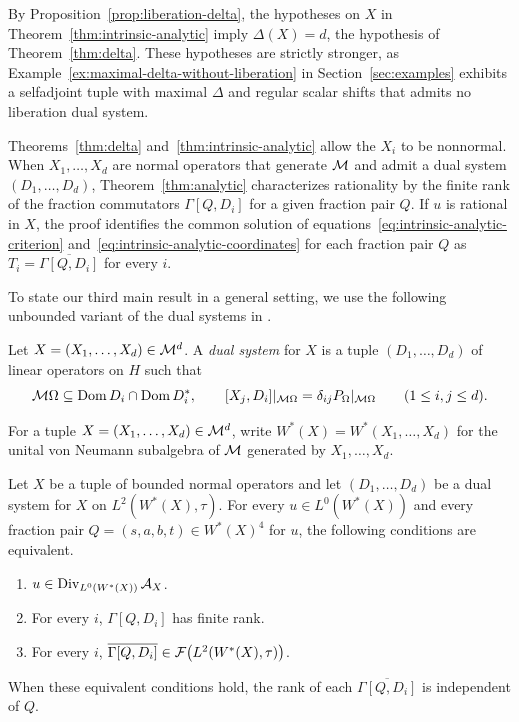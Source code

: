 By Proposition~\ref{prop:liberation-delta}, the hypotheses on $X$ in Theorem~\ref{thm:intrinsic-analytic} imply $\Delta(X)=d$, the hypothesis of Theorem~\ref{thm:delta}.
These hypotheses are strictly stronger, as Example~\ref{ex:maximal-delta-without-liberation} in Section~\ref{sec:examples} exhibits a selfadjoint tuple with maximal $\Delta$ and regular scalar shifts that admits no liberation dual system.

Theorems~\ref{thm:delta} and~\ref{thm:intrinsic-analytic} allow the $X_i$ to be nonnormal.
When $X_1,\ldots,X_d$ are normal operators that generate $\mathcal M$ and admit a dual system $(D_1,\ldots,D_d)$, Theorem~\ref{thm:analytic} characterizes rationality by the finite rank of the fraction commutators $\Gamma[Q,D_i]$ for a given fraction pair $Q$.
If $u$ is rational in $X$, the proof identifies the common solution of equations~\eqref{eq:intrinsic-analytic-criterion} and~\eqref{eq:intrinsic-analytic-coordinates} for each fraction pair $Q$ as $T_i=\overline{\Gamma[Q,D_i]}$ for every $i$.

To state our third main result in a general setting, we use the following unbounded variant of the dual systems in \cite[Definition~5.1]{Voi98}.

\begin{definition}\label{def:dual-system}
Let $X=(X_1,\ldots,X_d)\in\mathcal M^d$.
A \emph{dual system} for $X$ is a tuple $(D_1,\ldots,D_d)$ of linear operators on $H$ such that
\begin{equation}\label{eq:analytic-hyp}
 \mathcal M\Omega\subseteq\operatorname{Dom} D_i\cap\operatorname{Dom} D_i^*,\qquad
 [X_j,D_i]|_{\mathcal M\Omega}=\delta_{ij}P_\Omega|_{\mathcal M\Omega}
 \qquad(1\leq i,j\leq d).
\end{equation}
\end{definition}

For a tuple $X=(X_1,\ldots,X_d)\in\mathcal M^d$, write $W^*(X)=W^*(X_1,\ldots,X_d)$ for the unital von Neumann subalgebra of $\mathcal M$ generated by $X_1,\dots,X_d$.

\begin{theorem}\label{thm:analytic}
Let $X$ be a tuple of bounded normal operators and let $(D_1,\ldots,D_d)$ be a dual system for $X$ on $L^2(W^*(X),\tau)$.
For every $u\in L^0(W^*(X))$ and every fraction pair $Q=(s,a,b,t)\in W^*(X)^4$ for $u$, the following conditions are equivalent.
\begin{enumerate}
\item $u\in\operatorname{Div}_{L^0(W^*(X))}\mathcal A_X$.
\item For every $i$, $\Gamma[Q,D_i]$ has finite rank.
\item\label{item:analytic-fraction-commutators} For every $i$, $\overline{\Gamma[Q,D_i]}\in\mathcal F\bigl(L^2(W^*(X),\tau)\bigr)$.
\end{enumerate}
When these equivalent conditions hold, the rank of each $\overline{\Gamma[Q,D_i]}$ is independent of $Q$.
\end{theorem}

